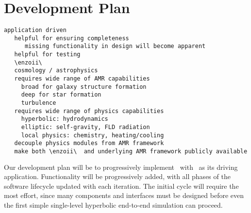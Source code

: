 \documentclass[10pt]{article}
\begin{document}

\section{Development Plan} \label{s:plan} 


\begin{verbatim}
application driven
   helpful for ensuring completeness
      missing functionality in design will become apparent
   helpful for testing
   \enzoii\ 
   cosmology / astrophysics
   requires wide range of AMR capabilities
     broad for galaxy structure formation
     deep for star formation
     turbulence
   requires wide range of physics capabilities
     hyperbolic: hydrodynamics
     elliptic: self-gravity, FLD radiation
     local physics: chemistry, heating/cooling
   decouple physics modules from AMR framework
   make both \enzoii\  and underlying AMR framework publicly available
\end{verbatim}


Our development plan will be to progressively implement \charm\ with
\enzoii\ as its driving application.  Functionality will be
progressively added, with all phases of the software lifecycle updated
with each iteration.  The initial cycle will require the most effort,
since many components and interfaces must be designed before even the
first simple single-level hyperbolic end-to-end simulation can
proceed.
\end{document}
